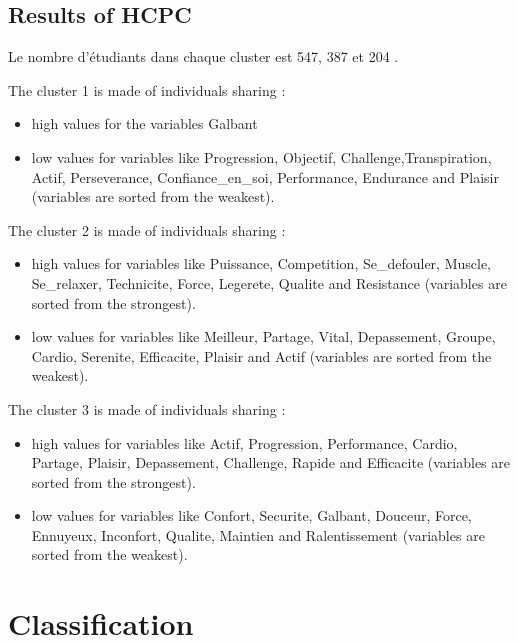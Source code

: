 \documentclass[12pt]{article}
\begin{document}
\subsection{Results of HCPC}

Le nombre d'étudiants dans chaque cluster est  547, 387 et 204 .

The cluster 1 is made of individuals sharing :
\begin{itemize}
    \item  high values for the variables Galbant
    
    \item  low values for variables like Progression, Objectif, Challenge,Transpiration, Actif, Perseverance, Confiance\_en\_soi, Performance, Endurance and Plaisir (variables are sorted from the weakest).
\end{itemize}

The cluster 2 is made of individuals sharing :
\begin{itemize}
    \item  high values for variables like Puissance, Competition, Se\_defouler, Muscle, Se\_relaxer, Technicite, Force, Legerete, Qualite and Resistance (variables are sorted from the strongest).
    
    \item  low values for variables like Meilleur, Partage, Vital, Depassement, Groupe, Cardio, Serenite, Efficacite, Plaisir and Actif (variables are sorted from the weakest).
\end{itemize}


The cluster 3 is made of individuals sharing :
\begin{itemize}
    \item  high values for variables like Actif, Progression, Performance, Cardio, Partage, Plaisir, Depassement, Challenge, Rapide and Efficacite (variables are sorted from the strongest).
    
    \item  low values for variables like Confort, Securite, Galbant, Douceur, Force, Ennuyeux, Inconfort, Qualite, Maintien and Ralentissement (variables are sorted from the weakest).
\end{itemize}




\section{Classification}  %
 
\end{document}
